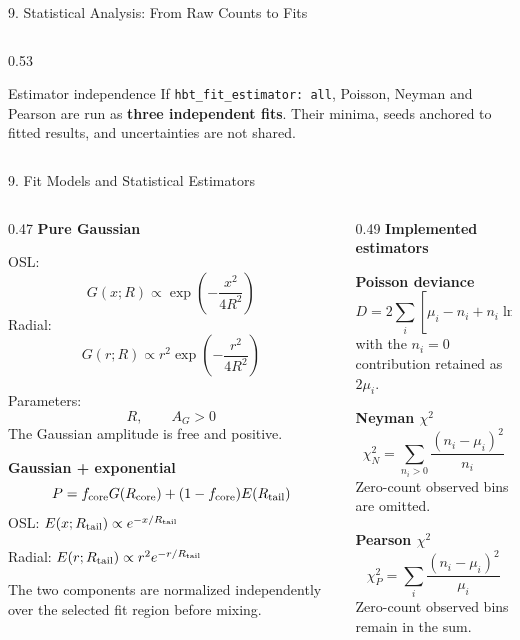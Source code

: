 \documentclass{beamer}
\begin{document}
\begin{frame}{9. Statistical Analysis: From Raw Counts to Fits}
\begin{columns}[T]
\begin{column}{0.53\textwidth}
\begin{block}{Estimator independence}
If \texttt{hbt\_fit\_estimator: all}, Poisson, Neyman and Pearson are run as \textbf{three independent fits}. Their minima, seeds anchored to fitted results, and uncertainties are not shared.
\end{block}
\end{column}

\end{columns}

\end{frame}


\begin{frame}{9. Fit Models and Statistical Estimators}
\fontsize{6.3}{7.0}\selectfont

\begin{columns}[T]

\begin{column}{0.47\textwidth}
\textbf{Pure Gaussian}

\smallskip
OSL:
\[
G(x;R)\propto \exp\!\left(-\frac{x^2}{4R^2}\right)
\]
Radial:
\[
G(r;R)\propto r^2\exp\!\left(-\frac{r^2}{4R^2}\right)
\]

Parameters:
\[
R,\qquad A_G>0
\]
The Gaussian amplitude is free and positive.

\medskip
\textbf{Gaussian + exponential}
\[
P=f_{\rm core}G(R_{\rm core})+
(1-f_{\rm core})E(R_{\rm tail})
\]
OSL: $E(x;R_{\rm tail})\propto e^{-x/R_{\rm tail}}$

Radial: $E(r;R_{\rm tail})\propto r^2 e^{-r/R_{\rm tail}}$

\smallskip
The two components are normalized independently over the selected fit region before mixing.
\end{column}

\begin{column}{0.49\textwidth}
\textbf{Implemented estimators}

\smallskip
\textbf{Poisson deviance}
\vspace{-0.35em}
\[
D=2\sum_i\left[\mu_i-n_i+n_i\ln\!\left(\frac{n_i}{\mu_i}\right)\right]
\]
\vspace{-0.45em}
with the $n_i=0$ contribution retained as $2\mu_i$.

\smallskip
\textbf{Neyman $\chi^2$}
\vspace{-0.35em}
\[
\chi^2_N=\sum_{n_i>0}\frac{(n_i-\mu_i)^2}{n_i}
\]
\vspace{-0.45em}
Zero-count observed bins are omitted.

\smallskip
\textbf{Pearson $\chi^2$}
\vspace{-0.35em}
\[
\chi^2_P=\sum_i\frac{(n_i-\mu_i)^2}{\mu_i}
\]
\vspace{-0.4em}
Zero-count observed bins remain in the sum.


\end{column}
\end{columns}
\end{frame}
\end{document}
